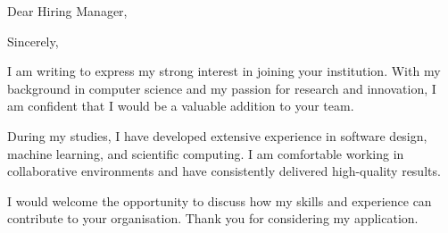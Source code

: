 \date{\today}
\subject{Application for a Position}
\opening{Dear Hiring Manager,}
\closing{Sincerely,}

\makelettertitle

I am writing to express my strong interest in joining your institution. With my background in computer science and my passion for research and innovation, I am confident that I would be a valuable addition to your team.

During my studies, I have developed extensive experience in software design, machine learning, and scientific computing. I am comfortable working in collaborative environments and have consistently delivered high-quality results.

I would welcome the opportunity to discuss how my skills and experience can contribute to your organisation. Thank you for considering my application.

\makeletterclosing
